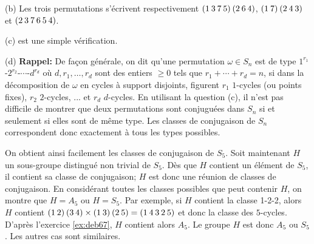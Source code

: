 {{(b) Les trois permutations s'\'ecrivent respectivement $(1\hskip 2pt 3\hskip 2pt 7\hskip 2pt
5)\hskip 2pt (2\hskip 2pt 6\hskip 2pt 4)$, $(1\hskip 2pt 7)\hskip 2pt (2\hskip 2pt 4\hskip
2pt 3)$ et $(2\hskip 2pt 3\hskip 2pt 7\hskip 2pt 6\hskip 2pt 5\hskip 2pt 4)$.
\smallskip

(c) est une simple v\'erification.
\smallskip

(d) {\bf Rappel:} De fa\c con g\'en\'erale, on dit qu'une permutation $\omega \in S_n$ est de
type $1^{r_1}$-$2^{r_2}$-$\cdots$-$d^{r_d}$ o\`u $d, r_1,\ldots,r_d$ sont des entiers $\geq 0$
tels que $r_1+\cdots+r_d=n$, si dans la d\'ecomposition de $\omega$ en cycles \`a support
disjoints, figurent $r_1$ $1$-cycles (ou points fixes), $r_2$ $2$-cycles, ... et $r_d$
$d$-cycles. En utilisant la question (c), il n'est pas difficile de montrer que deux
permutations sont conjugu\'ees dans $S_n$ si et seulement si elles sont de m\^eme type.    
Les classes de conjugaison de $S_n$ correspondent donc exactement \`a tous les types
possibles.

\smallskip
On obtient ainsi facilement les classes de conjugaison de $S_5$. Soit maintenant $H$ un
sous-groupe distingu\'e non trivial de $S_5$. D\`es que $H$ contient un \'el\'ement de $S_5$,
il contient sa classe de conjugaison; $H$ est donc une r\'eunion de classes de conjugaison.
En consid\'erant toutes les classes possibles que peut contenir $H$, on montre que $H=A_5$ ou
$H=S_5$. Par exemple, si $H$ contient la classe 1-2-2, alors $H$ contient $(1\hskip 2pt
2)\hskip 2pt (3\hskip 2pt 4) \times (1\hskip 2pt 3)\hskip 2pt (2\hskip 2pt 5) = (1\hskip 2pt
4\hskip 2pt 3\hskip 2pt 2\hskip 2pt 5)$ et donc la classe des $5$-cycles. D'apr\`es
l'exercice \ref{ex:deb67}, $H$ contient alors $A_5$. Le groupe $H$ est donc $A_5$ ou $S_5$. Les autres cas
sont similaires.}
}
